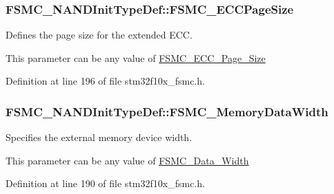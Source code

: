 \hypertarget{struct_f_s_m_c___n_a_n_d_init_type_def_a7ed6a25710ba724a7a8f90af60130cf6}{
\subsubsection[{F\-S\-M\-C\-\_\-\-E\-C\-C\-Page\-Size}]{ F\-S\-M\-C\-\_\-\-N\-A\-N\-D\-Init\-Type\-Def\-::\-F\-S\-M\-C\-\_\-\-E\-C\-C\-Page\-Size}}\label{struct_f_s_m_c___n_a_n_d_init_type_def_a7ed6a25710ba724a7a8f90af60130cf6}
\begin{DoxyVerb}      Defines the page size for the extended ECC.
\end{DoxyVerb}
 This parameter can be any value of \hyperlink{group___f_s_m_c___e_c_c___page___size}{F\-S\-M\-C\-\_\-\-E\-C\-C\-\_\-\-Page\-\_\-\-Size} 

Definition at line 196 of file stm32f10x\-\_\-fsmc.\-h.

\hypertarget{struct_f_s_m_c___n_a_n_d_init_type_def_ab4a4f56aab3150d8fb02aaf092db0235}{
\subsubsection[{F\-S\-M\-C\-\_\-\-Memory\-Data\-Width}]{ F\-S\-M\-C\-\_\-\-N\-A\-N\-D\-Init\-Type\-Def\-::\-F\-S\-M\-C\-\_\-\-Memory\-Data\-Width}}\label{struct_f_s_m_c___n_a_n_d_init_type_def_ab4a4f56aab3150d8fb02aaf092db0235}
\begin{DoxyVerb}  Specifies the external memory device width.
\end{DoxyVerb}
 This parameter can be any value of \hyperlink{group___f_s_m_c___data___width}{F\-S\-M\-C\-\_\-\-Data\-\_\-\-Width} 

Definition at line 190 of file stm32f10x\-\_\-fsmc.\-h.

